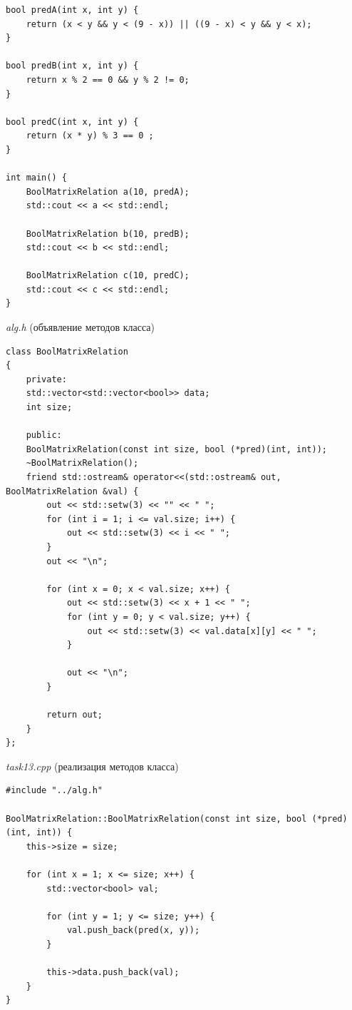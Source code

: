\documentclass[a4paper,14pt]{extarticle}
\begin{document}
\begin{enumerate}[label=1.\arabic*.]
\begin{verbatim}
bool predA(int x, int y) {
	return (x < y && y < (9 - x)) || ((9 - x) < y && y < x);
}

bool predB(int x, int y) {
	return x % 2 == 0 && y % 2 != 0;
}

bool predC(int x, int y) {
	return (x * y) % 3 == 0 ;
}

int main() {
	BoolMatrixRelation a(10, predA);
	std::cout << a << std::endl;
	
	BoolMatrixRelation b(10, predB);
	std::cout << b << std::endl;
	
	BoolMatrixRelation c(10, predC);
	std::cout << c << std::endl;
}
    	\end{verbatim}
	      \textit{alg.h} (объявление методов класса)
	      \begin{verbatim}
class BoolMatrixRelation
{
	private:
	std::vector<std::vector<bool>> data;
	int size;
	
	public:
	BoolMatrixRelation(const int size, bool (*pred)(int, int));
	~BoolMatrixRelation();
	friend std::ostream& operator<<(std::ostream& out, BoolMatrixRelation &val) {
		out << std::setw(3) << "" << " ";
		for (int i = 1; i <= val.size; i++) {
			out << std::setw(3) << i << " ";
		}
		out << "\n";
		
		for (int x = 0; x < val.size; x++) {
			out << std::setw(3) << x + 1 << " ";
			for (int y = 0; y < val.size; y++) {
				out << std::setw(3) << val.data[x][y] << " ";
			}
			
			out << "\n";
		}
		
		return out;
	}
};
\end{verbatim}
	      \textit{task13.cpp} (реализация методов класса)
	      \begin{verbatim}
#include "../alg.h"

BoolMatrixRelation::BoolMatrixRelation(const int size, bool (*pred)(int, int)) {
	this->size = size;
	
	for (int x = 1; x <= size; x++) {
		std::vector<bool> val;
		
		for (int y = 1; y <= size; y++) {
			val.push_back(pred(x, y));
		}
		
		this->data.push_back(val);
	}
}


\end{verbatim}
\end{enumerate}
\end{document}
